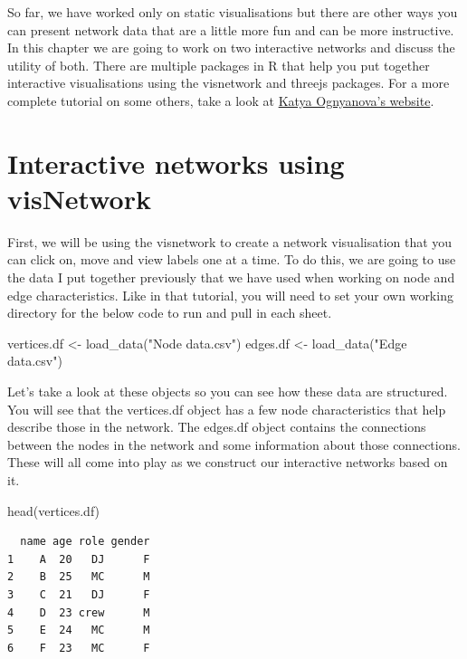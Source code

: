 \documentclass[
  letterpaper,
  DIV=11,
  numbers=noendperiod]{scrreprt}
\newenvironment{Shaded}{\begin{snugshade}}{\end{snugshade}}
\newcommand{\FunctionTok}[1]{\textcolor[rgb]{0.28,0.35,0.67}{#1}}
\newcommand{\NormalTok}[1]{\textcolor[rgb]{0.00,0.23,0.31}{#1}}
\newcommand{\OtherTok}[1]{\textcolor[rgb]{0.00,0.23,0.31}{#1}}
\newcommand{\StringTok}[1]{\textcolor[rgb]{0.13,0.47,0.30}{#1}}
\begin{document}
So far, we have worked only on static visualisations but there are other
ways you can present network data that are a little more fun and can be
more instructive. In this chapter we are going to work on two
interactive networks and discuss the utility of both. There are multiple
packages in R that help you put together interactive visualisations
using the visnetwork and threejs packages. For a more complete tutorial
on some others, take a look at
\href{https://kateto.net/network-visualization}{Katya Ognyanova's
website}.

\section{Interactive networks using
visNetwork}\label{interactive-networks-using-visnetwork}

First, we will be using the visnetwork to create a network visualisation
that you can click on, move and view labels one at a time. To do this,
we are going to use the data I put together previously that we have used
when working on node and edge characteristics. Like in that tutorial,
you will need to set your own working directory for the below code to
run and pull in each sheet.

\begin{Shaded}
\begin{Highlighting}[]
\NormalTok{vertices.df }\OtherTok{\textless{}{-}} \FunctionTok{load\_data}\NormalTok{(}\StringTok{"Node data.csv"}\NormalTok{)}
\NormalTok{edges.df }\OtherTok{\textless{}{-}} \FunctionTok{load\_data}\NormalTok{(}\StringTok{"Edge data.csv"}\NormalTok{)}
\end{Highlighting}
\end{Shaded}

Let's take a look at these objects so you can see how these data are
structured. You will see that the vertices.df object has a few node
characteristics that help describe those in the network. The edges.df
object contains the connections between the nodes in the network and
some information about those connections. These will all come into play
as we construct our interactive networks based on it.

\begin{Shaded}
\begin{Highlighting}[]
\FunctionTok{head}\NormalTok{(vertices.df)}
\end{Highlighting}
\end{Shaded}

\begin{verbatim}
  name age role gender
1    A  20   DJ      F
2    B  25   MC      M
3    C  21   DJ      F
4    D  23 crew      M
5    E  24   MC      M
6    F  23   MC      F
\end{verbatim}
\end{document}
